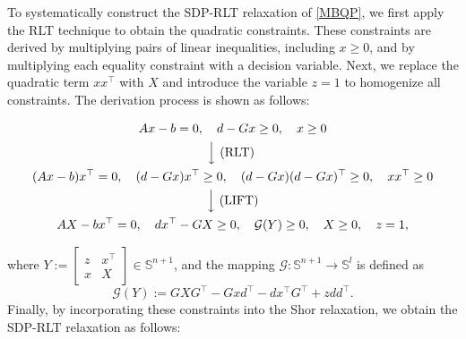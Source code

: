 \documentclass[11pt]{article}
\theoremstyle{plain}
\def\G{\mathcal{G}}
\def\S{\mathbb{S}}
\begin{document}
To systematically construct the SDP-RLT relaxation of \eqref{MBQP}, we first apply the RLT technique to obtain the quadratic constraints. These constraints are derived by multiplying pairs of linear inequalities, including $x \geq 0$, and by multiplying each equality constraint with a decision variable. Next, we replace the quadratic term $xx^\top$ with $X$ and introduce the variable $z = 1$ to homogenize all constraints. The derivation process is shown as follows:
%
\begin{tcolorbox}[colframe=black, colback=white, boxrule=1pt, arc=2mm, top=0pt]
\begin{gather*}
 Ax - b = 0, \quad d - Gx \geq 0, \quad x \geq 0  \\
 \Big\downarrow  \text{ (RLT)}\phantom{\text{.}}  \\
 (Ax - b)x^\top = 0, \quad (d - Gx)x^\top \geq 0, \quad (d - Gx)(d - Gx)^\top \geq 0, \quad xx^\top \geq 0 \\
  \Big\downarrow \text{ (LIFT)}  \\
 AX-bx^\top = 0, \quad dx^\top-GX \geq 0, \quad \G(Y) \geq 0, \quad X \geq 0,\quad z=1,
\end{gather*}
\end{tcolorbox}
%
\noindent where $Y:=\begin{bmatrix}z& x^\top \\ x & X\end{bmatrix}\in  \mathbb{S}^{n+1}$, and  the mapping $\G:\S^{n+1}\rightarrow\S^{l}$ is defined as 
\begin{equation}\label{def-G}
\G(Y):=GXG^\top -Gxd^\top -dx^\top G^\top+zdd^\top.
\end{equation}
Finally, by incorporating these constraints into the Shor relaxation, we obtain the SDP-RLT relaxation as follows:
\end{document}
